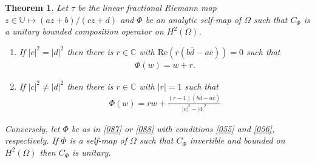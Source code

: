 \documentclass[11pt]{amsart}%
\newtheorem{thm}{Theorem}[section]
\theoremstyle{definition}
\theoremstyle{remark}
\numberwithin{equation}{section}
\begin{document}
\begin{thm}
\label{060}  Let $\tau$ be the linear fractional Riemann map $z\in \mathbb{U} \mapsto (az+b)/(cz+d)$ and $\Phi$ be an analytic self-map of $\Omega$ such that
$C_{\Phi}$ is a unitary bounded composition operator on $H^{2}(\Omega)$.

\begin{enumerate}
\item \label{055} If $|c|^{2}=|d|^{2}$ then there is $r\in\mathbb{C}$ with
$\mathrm{Re}(\overline{r}(b\overline{d}-a\overline{c}))=0$ such that
\begin{align}
\label{087}\Phi(w)=w+r.
\end{align}


\item \label{056} If $|c|^{2}\neq|d|^{2}$ then there is $r\in\mathbb{C}$ with
$|r|=1$ such that
\begin{align}
\label{088}\Phi(w)=rw+\frac{(r-1)(b\overline{d}-a\overline{c})}{|c|^{2}%
-|d|^{2}}%
\end{align}

\end{enumerate}

Conversely, let $\Phi$ be as in \eqref{087} or \eqref{088} with conditions
\eqref{055} and \eqref{056}, respectively. If $\Phi$ is a self-map
of $\Omega$ such that $C_{\Phi}$ invertible and bounded on $H^{2}(\Omega)$ then
$C_{\Phi}$ is unitary.
\end{thm}
\end{document}
